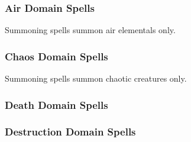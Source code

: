 \subsubsection{Air Domain Spells}

\begin{spelllist}
    \SLfeatherfall[1]
    \SLgentledescent[1]
    \SLzephyrblade[1]
    \SLgentledescent[2]
    \SLwindstrike[2]
    \SLgaseousform[3]
    \SLairwalk[4]
    \SLcalllightning[4]
    \SLgentledescentmass[4]
    \SLsummonmonsterv[4]
    \SLzephyrbladegreater[4]
    \SLwindstrikegreater[5]
    \SLskysmite[6]
    \SLstormlord[6]
    \SLsummonmonsterviii[7]
    \SLcalllightninggreater[8]
    \SLreversegravity[8]
    \SLstormofvengeance[9]
\end{spelllist}
Summoning spells summon air elementals only.

\subsubsection{Chaos Domain Spells}

\begin{spelllist}
    \SLentropicshield[1]
    \SLforget[1]
    \SLprotectionfromalignment[2]
    \SLconfusion[3]
    \SLsummonmonsteriii[3]
    \SLchaoshammer[3]
    \SLprismaticwall[5]
    \SLcacaphonicword[6]
    \SLsummonmonstervi[6]
    \SLprismaticspray[6]
    \SLcloakofchaos[8]
    \SLdiscordantsong[8]
    \SLirresistibledance[9]
    \SLsummonmonsterix[9]
\end{spelllist}
Summoning spells summon chaotic creatures only.

\subsubsection{Death Domain Spells}

\begin{spelllist}
    \SLunlivingheart[1]
    \SLwavesoffatiguelesser[1]
    \SLdeathward[3]
    \SLcurseofbloodandbone[3]
    \SLcurseofenfeeblement[4]
    \SLenervation[4]
    \SLpoison[4]
    \SLwavesoffatigue[4]
    \SLdeathknell[6]
    \SLharm[6]
    \SLdeathwardmass[7]
    \SLfingerofdeath[7]
    \SLwavesoffatiguegreater[7]
    \SLenervationgreater[8]
    \SLwailofthebanshee[9]
\end{spelllist}

\subsubsection{Destruction Domain Spells}

